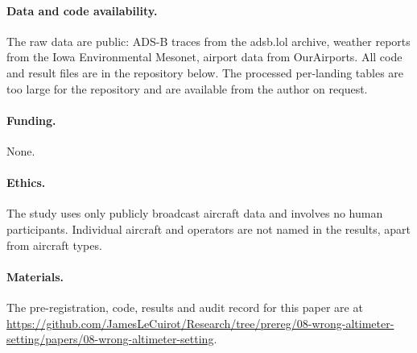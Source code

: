 \documentclass[11pt]{article}
\begin{document}
\paragraph{Data and code availability.} The raw data are public: ADS-B traces from the adsb.lol archive, weather reports from the Iowa Environmental Mesonet, airport data from OurAirports. All code and result files are in the repository below. The processed per-landing tables are too large for the repository and are available from the author on request.
\paragraph{Funding.} None.
\paragraph{Ethics.} The study uses only publicly broadcast aircraft data and involves no human participants. Individual aircraft and operators are not named in the results, apart from aircraft types.
\paragraph{Materials.} The pre-registration, code, results and audit record for this paper are at \url{https://github.com/JamesLeCuirot/Research/tree/prereg/08-wrong-altimeter-setting/papers/08-wrong-altimeter-setting}.



\end{document}
